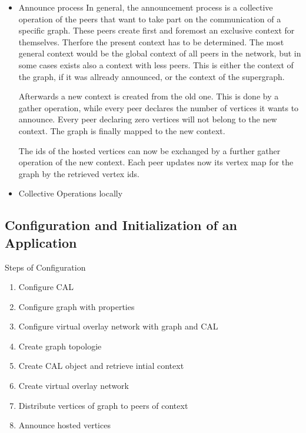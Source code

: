 \begin{itemize}
  \item Announce process
    In general, the announcement process is a collective operation of
    the peers that want to take part on the communication of a
    specific graph. These peers create first and foremost an exclusive
    context for themselves. Therfore the present context has to be
    determined. The most general context would be the global context
    of all peers in the network, but in some cases exists also a
    context with less peers. This is either the context of the graph,
    if it was allready announced, or the context of the supergraph.

    Afterwards a new context is created from the old one. This is done
    by a gather operation, while every peer declares the number of
    vertices it wants to announce. Every peer declaring zero vertices
    will not belong to the new context. The graph is finally mapped
    to the new context.

    The ids of the hosted vertices can now be exchanged by a further
    gather operation of the new context. Each peer updates now its
    vertex map for the graph by the retrieved vertex ids.

  \item Collective Operations locally

\end{itemize}

\subsection{Configuration and Initialization of an Application}

  Steps of Configuration

  \begin{enumerate}
  \item Configure CAL 
  \item Configure graph with properties
  \item Configure virtual overlay network with graph and CAL

  \item Create graph topologie
  \item Create CAL object and retrieve intial context
  \item Create virtual overlay network

  \item Distribute vertices of graph to peers of context
  \item Announce hosted vertices
  \end{enumerate}
  

